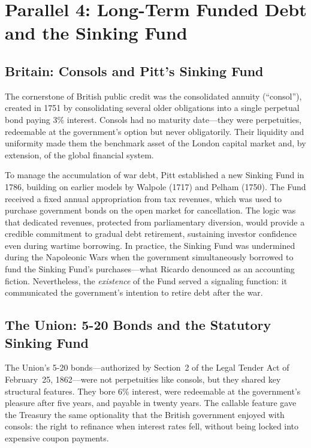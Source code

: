 \documentclass[12pt]{article}
\begin{document}
\section{Parallel 4: Long-Term Funded Debt and the Sinking Fund}
\label{sec:funded-debt}

\subsection{Britain: Consols and Pitt's Sinking Fund}

The cornerstone of British public credit was the consolidated annuity
(``consol''), created in 1751 by consolidating several older
obligations into a single perpetual bond paying 3\% interest. Consols
had no maturity date---they were perpetuities, redeemable at the
government's option but never obligatorily. Their liquidity and
uniformity made them the benchmark asset of the London capital market
and, by extension, of the global financial system.

To manage the accumulation of war debt, Pitt established a new Sinking
Fund in 1786, building on earlier models by Walpole (1717) and Pelham
(1750). The Fund received a fixed annual appropriation from tax
revenues, which was used to purchase government bonds on the open market
for cancellation. The logic was that dedicated revenues, protected from
parliamentary diversion, would provide a credible commitment to
gradual debt retirement, sustaining investor confidence even during
wartime borrowing. In practice, the Sinking Fund was undermined during
the Napoleonic Wars when the government simultaneously borrowed to fund
the Sinking Fund's purchases---what Ricardo denounced as an accounting
fiction. Nevertheless, the \textit{existence} of the Fund served a
signaling function: it communicated the government's intention to
retire debt after the war.

\subsection{The Union: 5-20 Bonds and the Statutory Sinking Fund}

The Union's 5-20 bonds---authorized by Section~2 of the Legal Tender
Act of February~25, 1862---were not perpetuities like consols, but they
shared key structural features. They bore 6\% interest, were redeemable
at the government's pleasure after five years, and payable in twenty
years. The callable feature gave the Treasury the same optionality that
the British government enjoyed with consols: the right to refinance when
interest rates fell, without being locked into expensive coupon
payments.
\end{document}
